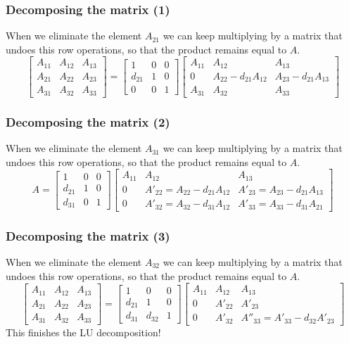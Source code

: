 \begin{frame}[fragile]
  \frametitle{Decomposing the matrix (1)}
  When we eliminate the element $A_{21}$ we can keep multiplying by a matrix that undoes this row operations, so that the product remains equal to $A$.
\[ 
\begin{bmatrix}
A_{11} & A_{12} & A_{13}\\ 
A_{21} & A_{22} & A_{23}\\ 
A_{31} & A_{32} & A_{33}
\end{bmatrix} = 
\begin{bmatrix}
1 & 0 & 0 \\
d_{21}& 1 & 0 \\
0 & 0 & 1
\end{bmatrix}
\begin{bmatrix}
A_{11} & A_{12} & A_{13}\\ 
0 & A_{22}-d_{21}A_{12} & A_{23}-d_{21}A_{13}\\ 
A_{31} & A_{32} & A_{33}
\end{bmatrix}
\]
\end{frame}

\begin{frame}[fragile]
  \frametitle{Decomposing the matrix (2)}
  When we eliminate the element $A_{31}$ we can keep multiplying by a matrix that undoes this row operations, so that the product remains equal to $A$.
\[ 
A = 
\begin{bmatrix}
1 & 0 & 0 \\
d_{21}& 1 & 0 \\
d_{31} & 0 & 1
\end{bmatrix}
\begin{bmatrix}
A_{11} & A_{12} & A_{13}\\ 
0 & A'_{22}=A_{22}-d_{21}A_{12} & A'_{23} = A_{23}-d_{21}A_{13}\\ 
0 & A'_{32} = A_{32}-d_{31}A_{12} & A'_{33} = A_{33}-d_{31}A_{21}
\end{bmatrix}
\]
\end{frame}

\begin{frame}[fragile]
  \frametitle{Decomposing the matrix (3)}
  When we eliminate the element $A_{32}$ we can keep multiplying by a matrix that undoes this row operations, so that the product remains equal to $A$.
\[ 
\begin{bmatrix}
A_{11} & A_{12} & A_{13}\\ 
A_{21} & A_{22} & A_{23}\\ 
A_{31} & A_{32} & A_{33}
\end{bmatrix} = 
\begin{bmatrix}
1 & 0 & 0 \\
d_{21}& 1 & 0 \\
d_{31} & d_{32} & 1
\end{bmatrix}
\begin{bmatrix}
A_{11} & A_{12} & A_{13}\\ 
0 & A'_{22} & A'_{23} \\ 
0 & A'_{32}  & A''_{33} = A'_{33}-d_{32}A'_{23}
\end{bmatrix}
\]\pause
This finishes the LU decomposition!
\end{frame}

